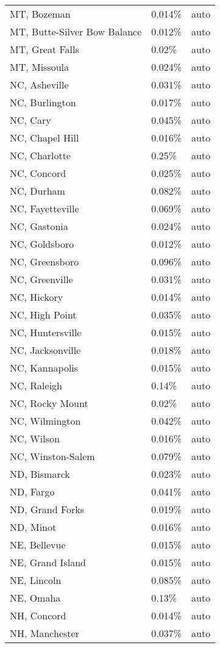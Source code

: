 \begin{longtable}[]{@{}lll@{}}
MT, Bozeman & 0.014\% & auto \\
MT, Butte-Silver Bow Balance & 0.012\% & auto \\
MT, Great Falls & 0.02\% & auto \\
MT, Missoula & 0.024\% & auto \\
NC, Asheville & 0.031\% & auto \\
NC, Burlington & 0.017\% & auto \\
NC, Cary & 0.045\% & auto \\
NC, Chapel Hill & 0.016\% & auto \\
NC, Charlotte & 0.25\% & auto \\
NC, Concord & 0.025\% & auto \\
NC, Durham & 0.082\% & auto \\
NC, Fayetteville & 0.069\% & auto \\
NC, Gastonia & 0.024\% & auto \\
NC, Goldsboro & 0.012\% & auto \\
NC, Greensboro & 0.096\% & auto \\
NC, Greenville & 0.031\% & auto \\
NC, Hickory & 0.014\% & auto \\
NC, High Point & 0.035\% & auto \\
NC, Huntersville & 0.015\% & auto \\
NC, Jacksonville & 0.018\% & auto \\
NC, Kannapolis & 0.015\% & auto \\
NC, Raleigh & 0.14\% & auto \\
NC, Rocky Mount & 0.02\% & auto \\
NC, Wilmington & 0.042\% & auto \\
NC, Wilson & 0.016\% & auto \\
NC, Winston-Salem & 0.079\% & auto \\
ND, Bismarck & 0.023\% & auto \\
ND, Fargo & 0.041\% & auto \\
ND, Grand Forks & 0.019\% & auto \\
ND, Minot & 0.016\% & auto \\
NE, Bellevue & 0.015\% & auto \\
NE, Grand Island & 0.015\% & auto \\
NE, Lincoln & 0.085\% & auto \\
NE, Omaha & 0.13\% & auto \\
NH, Concord & 0.014\% & auto \\
NH, Manchester & 0.037\% & auto \\

\end{longtable}
